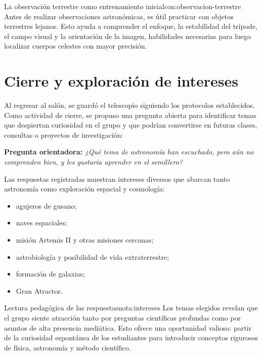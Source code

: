 \begin{concepto}{La observación terrestre como entrenamiento inicial}{con:observacion-terrestre}
    Antes de realizar observaciones astronómicas, es útil practicar con objetos
    terrestres lejanos. Esto ayuda a comprender el enfoque, la estabilidad del trípode,
    el campo visual y la orientación de la imagen, habilidades necesarias para luego
    localizar cuerpos celestes con mayor precisión.
\end{concepto}

\section{Cierre y exploración de intereses}

Al regresar al salón, se guardó el telescopio siguiendo los protocolos establecidos.
Como actividad de cierre, se propuso una pregunta abierta para identificar temas que
despiertan curiosidad en el grupo y que podrían convertirse en futuras clases,
consultas o proyectos de investigación:

\begin{destacado}
    \textbf{Pregunta orientadora:} \textit{¿Qué tema de astronomía han escuchado,
    pero aún no comprenden bien, y les gustaría aprender en el semillero?}
\end{destacado}

Las respuestas registradas muestran intereses diversos que abarcan tanto astronomía
como exploración espacial y cosmología:

\begin{itemize}[leftmargin=1.5em]
    \item agujeros de gusano;
    \item naves espaciales;
    \item misión Artemis II y otras misiones cercanas;
    \item astrobiología y posibilidad de vida extraterrestre;
    \item formación de galaxias;
    \item Gran Atractor.
\end{itemize}

\begin{nota}{Lectura pedagógica de las respuestas}{nota:intereses}
    Los temas elegidos revelan que el grupo siente atracción tanto por preguntas
    científicas profundas como por asuntos de alta presencia mediática. Esto ofrece
    una oportunidad valiosa: partir de la curiosidad espontánea de los estudiantes
    para introducir conceptos rigurosos de física, astronomía y método científico.
\end{nota}

